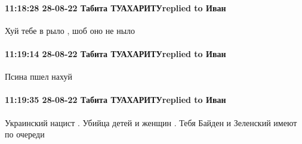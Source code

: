  
 
 
 
 

\paragraph{11:18:28 28-08-22 Табита ТУАХАРИТУreplied to Иван}

Хуй тебе в рыло , шоб оно не ныло

\paragraph{11:19:14 28-08-22 Табита ТУАХАРИТУreplied to Иван}

Псина пшел нахуй

\paragraph{11:19:35 28-08-22 Табита ТУАХАРИТУreplied to Иван}
Украинский нацист . Убийца детей и женщин . Тебя Байден и Зеленский имеют по очереди
